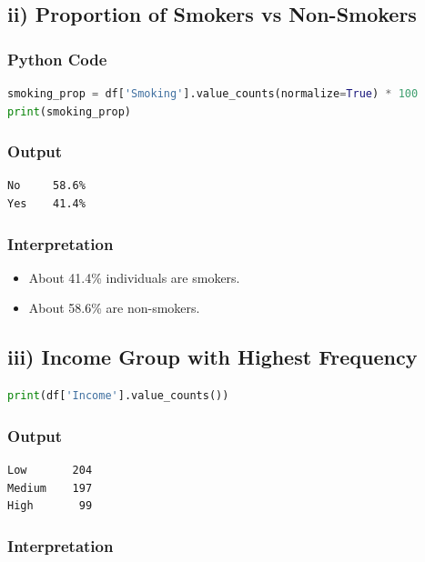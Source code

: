 \documentclass[12pt]{article}
\begin{document}
\subsection*{ii) Proportion of Smokers vs Non-Smokers}

\subsubsection*{Python Code}

\begin{lstlisting}[language=Python]
smoking_prop = df['Smoking'].value_counts(normalize=True) * 100
print(smoking_prop)
\end{lstlisting}

\subsubsection*{Output}

\begin{verbatim}
No     58.6%
Yes    41.4%
\end{verbatim}

\subsubsection*{Interpretation}

\begin{itemize}
\item About 41.4\% individuals are smokers.
\item About 58.6\% are non-smokers.
\end{itemize}

\subsection*{iii) Income Group with Highest Frequency}

\begin{lstlisting}[language=Python]
print(df['Income'].value_counts())
\end{lstlisting}

\subsubsection*{Output}

\begin{verbatim}
Low       204
Medium    197
High       99
\end{verbatim}

\subsubsection*{Interpretation}
\end{document}
